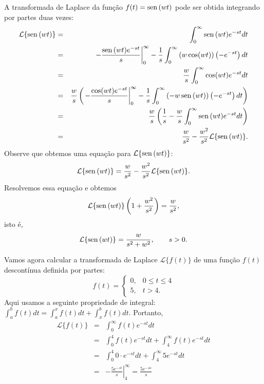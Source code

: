 \begin{ex}{\label{ex_trans_sin}}A transformada de Laplace da função $f(t)=\operatorname{sen}\,(w t)$ pode ser obtida integrando por partes duas vezes:
\begin{eqnarray*}
\mathcal{L}\{\operatorname{sen}\,(wt)\}&=&\int_0^\infty \operatorname{sen}\,(wt)e^{-st}dt\\
&=&\left.-\frac{\operatorname{sen}\,(wt)e^{-st}}{s}\right|_0^\infty-\frac{1}{s}\int_0^\infty \left(w\cos(wt)\right)\left(-e^{-st}\right)dt\\
&=&\frac{w}{s}\int_0^\infty \cos(wt)e^{-st}dt\\
&=&\frac{w}{s}\left(\left.-\frac{\cos(wt)e^{-st}}{s}\right|_0^\infty-\frac{1}{s}\int_0^\infty \left(-w\operatorname{sen}\,(wt)\right)\left(-e^{-st}\right)dt\right)\\
&=&\frac{w}{s}\left(\frac{1}{s}-\frac{w}{s}\int_0^\infty \operatorname{sen}\,(wt)e^{-st}dt\right)\\
&=&\frac{w}{s^2}-\frac{w^2}{s^2}\mathcal{L}\{\operatorname{sen}\,(wt)\} .
\end{eqnarray*}
Observe que obtemos uma equação para $\mathcal{L}\{\operatorname{sen}\,(wt)\}$:
\begin{equation}
\mathcal{L}\{\operatorname{sen}\,(wt)\} =\frac{w}{s^2}-\frac{w^2}{s^2}\mathcal{L}\{\operatorname{sen}\,(wt)\} .
\end{equation}
Resolvemos essa equação e obtemos
\begin{equation}
\mathcal{L}\{\operatorname{sen}\,(wt)\}\left(1+\frac{w^2}{s^2}\right)=\frac{w}{s^2},
\end{equation}
isto é,
\begin{equation}
\mathcal{L}\{\operatorname{sen}\,(wt)\}=\frac{w}{s^2+w^2},\qquad s>0.
\end{equation}
\end{ex}
\begin{ex} Vamos agora calcular a transformada de Laplace $\mathcal{L}\{f(t)\}$ de uma função $f(t)$ descontínua definida por partes:
\begin{equation}
f(t)=\left\{\begin{array}{ll} 0, &0\leq t\leq 4\\ 5, & t> 4.
\end{array}\right.
\end{equation}
Aqui usamos a seguinte propriedade de integral: $\int_a^b f(t)dt=\int_a^x f(t)dt+\int_x^b f(t)dt$. Portanto,
\begin{eqnarray*}
\mathcal{L}\{f(t)\}&=&\int_0^\infty f(t)e^{-st}dt\\
&=&\int_0^4 f(t)e^{-st}dt+\int_4^\infty f(t)e^{-st}dt\\
&=&\int_0^4 0\cdot e^{-st}dt+\int_4^\infty 5 e^{-st}dt\\
&=&\left.-\frac{5e^{-st}}{s}\right|_4^\infty=\frac{5e^{-4s}}{s}
\end{eqnarray*}
\end{ex}

